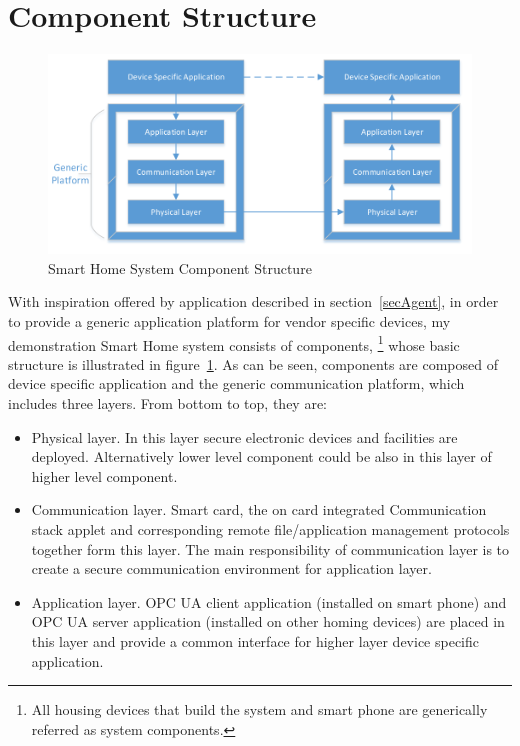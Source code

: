 \section {Component Structure}
 \begin{figure}[!htb]
	\centering
	\includegraphics[width=1.1\textwidth]{component}
		\caption{Smart Home System Component Structure}
	\label{fig:SmartHomeComponent}
\end{figure}
With inspiration offered by application described  in section~\ref{secAgent}, in order to provide a generic application platform for vendor specific devices, my demonstration Smart Home system consists of components, \footnote{All housing devices that build the system and  smart phone are generically referred as system components.} whose basic structure is illustrated in figure~\ref{fig:SmartHomeComponent}.  As can be seen, components are composed of device specific application and the generic communication platform, which includes three layers. From bottom to top, they are:

\begin{itemize}
\item Physical layer. In this layer secure electronic devices and facilities are deployed. Alternatively lower level component could be also in this layer of higher level component.
\item Communication layer. Smart card, the on card integrated Communication stack applet and corresponding remote file/application management protocols together form this layer. The main responsibility of communication layer is to create a secure communication environment for application layer.
\item Application layer. OPC UA client application (installed on smart phone) and OPC UA server application (installed on other homing devices) are placed in this layer and provide a common interface for higher layer device specific application. 
\end{itemize}

